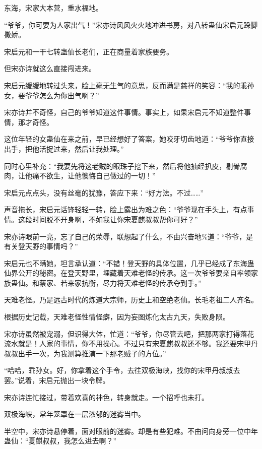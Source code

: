 
\begin{this_body}

东海，宋家大本营，重水福地。

“爷爷，你可要为人家出气！”宋亦诗风风火火地冲进书房，对八转蛊仙宋启元跺脚撒娇。

宋启元和一干七转蛊仙长老们，正在商量着家族要务。

但宋亦诗就这么直接闯进来。

宋启元缓缓地转过头来，脸上毫无生气的意思，反而满是慈祥的笑容：“我的乖孙女，要爷爷怎么为你出气啊？”

宋亦诗并不奇怪，自己的爷爷知道这件事情。事实上，如果宋启元不知道整件事情，那才奇怪。

这位年轻的女蛊仙在来之前，早已经想好了答案，她咬牙切齿地道：“爷爷你直接出手，把他活捉过来，然后让我处理。”

同时心里补充：“我要先将这老贼的眼珠子挖下来，然后将他抽经扒皮，剔骨腐肉，让他痛不欲生，让他懊悔自己做过的一切！”

宋启元点点头，没有丝毫的犹豫，答应下来：“好方法。不过……”

声音拖长，宋启元话锋轻轻一转，脸上露出为难之色：“爷爷现在手头上，有点事情。这段时间脱不开身啊，不如我让你宋夏麒叔叔帮你可好？”

宋亦诗眼前一亮，忘了自己的荣辱，联想起了什么，不由兴奋地\%道：“爷爷，是有关登天野的事情吗？”

宋启元也不瞒她，坦言承认道：“不错！登天野的具体位置，几乎已经成了东海蛊仙界公开的秘密。在登天野里，埋藏着天难老怪的传承。这一次爷爷要亲自率领家族蛊仙。和蔡家、若来家抗衡，尽力将天难老怪的传承夺到手。”

天难老怪。乃是远古时代的炼道大宗师，历史上和空绝老仙。长毛老祖二人齐名。

根据历史记载，天难老怪性情怪癖，因为妄图炼化太古九天，失败身陨。

宋亦诗虽然被宠溺，但识得大体，忙道：“爷爷，你尽管去吧，把那两家打得落花流水就是！人家的事情，你不用操心。不过只有宋夏麒叔叔还不够。我还要宋甲丹叔叔出手一次，为我测算推演一下那老贼子的方位。”

“哈哈，乖孙女。好，你拿着这个手令，去往双极海峡，找你的宋甲丹叔叔去罢。”说着，宋启元抛出一块令牌。

宋亦诗连忙接过，带着欢喜的神色，转身就走。一个招呼也未打。

双极海峡，常年笼罩在一层浓郁的迷雾当中。

半空中，宋亦诗悬停着，面对眼前的迷雾。却是有些犯难。不由问向身旁一位中年蛊仙：“夏麒叔叔，我怎么进去啊？”


\end{this_body}
